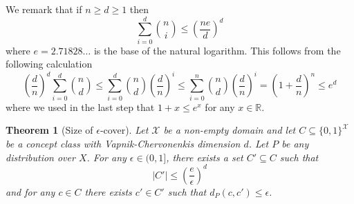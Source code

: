 \documentclass[10pt]{article}
\newtheorem{theorem}[proposition]{Theorem}
\newcommand{\R}{\mathbb{R}}
\newcommand{\X}{\mathcal{X}}
\begin{document}
We remark that if $n \ge d \ge 1$ then
\begin{equation}
\label{equation:sauer-lemma-estimate}
\sum_{i=0}^d \binom{n}{i} \le \left( \frac{ne}{d} \right)^d
\end{equation}
where $e = 2.71828 \dots$ is the base of the natural logarithm. This follows
from the following calculation
$$
\left( \frac{d}{n} \right)^d \sum_{i=0}^d \binom{n}{d}
\le \sum_{i=0}^d \binom{n}{d} \left( \frac{d}{n} \right)^i
\le \sum_{i=0}^n \binom{n}{d} \left( \frac{d}{n} \right)^i
= \left(1 + \frac{d}{n} \right)^n \le e^d
$$
where we used in the last step that $1 + x \le e^x$ for any $x \in \R$.


\begin{theorem}[Size of $\epsilon$-cover]
Let $\X$ be a non-empty domain and let $C \subseteq \{0,1\}^\X$ be a concept
class with Vapnik-Chervonenkis dimension $d$. Let $P$ be any distribution over
$X$. For any $\epsilon \in (0,1]$, there exists a set $C' \subseteq C$ such that
\begin{equation}
\label{equation:theorem-epsilon-cover}
|C'| \le \left( \frac{e}{\epsilon} \right)^d
\end{equation}
and for any $c \in C$ there exists $c' \in C'$ such that $d_P(c,c') \le \epsilon$.
\end{theorem}
\end{document}
